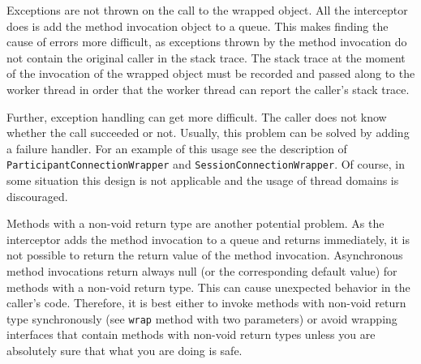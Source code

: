 Exceptions are not thrown on the call to the wrapped object. All the 
interceptor does is add the method invocation object to a queue. This makes
finding the cause of errors more difficult, as exceptions thrown by the
method invocation do not contain the original caller in the stack trace.
The stack trace at the moment of the invocation of the wrapped object must
be recorded and passed along to the worker thread in order that the worker
thread can report the caller's stack trace. 

Further, exception handling can get more difficult. The caller does not
know whether the call succeeded or not. Usually, this problem can be solved
by adding a failure handler. For an example of this usage see the
description of \texttt{ParticipantConnectionWrapper} and 
\texttt{SessionConnectionWrapper}. Of course, in some situation this
design is not applicable and the usage of thread domains is discouraged.

Methods with a non-void return type are another potential problem. As the
interceptor adds the method invocation to a queue and returns immediately,
it is not possible to return the return value of the method invocation.
Asynchronous method invocations return always null (or the corresponding
default value) for methods with a non-void return type. This can cause
unexpected behavior in the caller's code. Therefore, it is best either to
invoke methods with non-void return type synchronously (see \texttt{wrap}
method with two parameters) or avoid wrapping interfaces that contain
methods with non-void return types unless you are absolutely sure that
what you are doing is safe.


